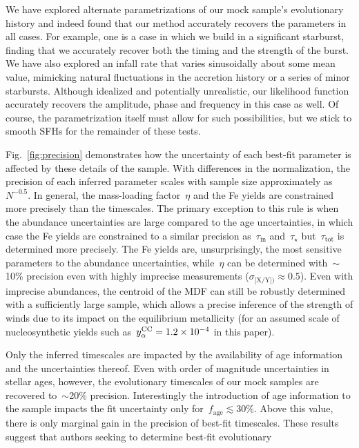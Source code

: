 \documentclass[foo.tex]{subfiles}
\begin{document}
We have explored alternate parametrizations of our mock sample's evolutionary
history and indeed found that our method accurately recovers the parameters
in all cases.
For example, one is a case in which we build in a significant starburst,
finding that we accurately recover both the timing and the strength of the
burst.
We have also explored an infall rate that varies sinusoidally about some mean
value, mimicking natural fluctuations in the accretion history or a series of
minor starbursts.
Although idealized and potentially unrealistic, our likelihood function
accurately recovers the amplitude, phase and frequency in this case as well.
Of course, the parametrization itself must allow for such possibilities, but
we stick to smooth SFHs for the remainder of these tests.
\par
Fig.~\ref{fig:precision} demonstrates how the uncertainty of each best-fit
parameter is affected by these details of the sample.
With differences in the normalization, the precision of each inferred parameter
scales with sample size approximately as~$N^{-0.5}$.
In general, the mass-loading factor~$\eta$ and the Fe yields are constrained
more precisely than the timescales.
The primary exception to this rule is when the abundance uncertainties are
large compared to the age uncertainties, in which case the Fe yields are
constrained to a similar precision as~$\tau_\text{in}$ and~$\tau_\star$
but~$\tau_\text{tot}$ is determined more precisely.
The Fe yields are, unsurprisingly, the most sensitive parameters to the
abundance uncertainties, while~$\eta$ can be determined with~$\sim$10\% precision
even with highly imprecise measurements ($\sigma_\text{[X/Y])} \approx 0.5$).
Even with imprecise abundances, the centroid of the MDF can still be robustly
determined with a sufficiently large sample, which allows a precise inference
of the strength of winds due to its impact on the equilibrium metallicity (for
an assumed scale of nucleosynthetic yields such as~$y_\alpha^\text{CC} = 1.2\times10^{-4}$
in this paper).
\par
Only the inferred timescales are impacted by the availability of age
information and the uncertainties thereof.
Even with order of magnitude uncertainties in stellar ages, however, the
evolutionary timescales of our mock samples are recovered to~$\sim$20\%
precision.
Interestingly the introduction of age information to the sample impacts the
fit uncertainty only for~$f_\text{age} \lesssim 30$\%.
Above this value, there is only marginal gain in the precision of best-fit
timescales.
These results suggest that authors seeking to determine best-fit evolutionary
\end{document}
